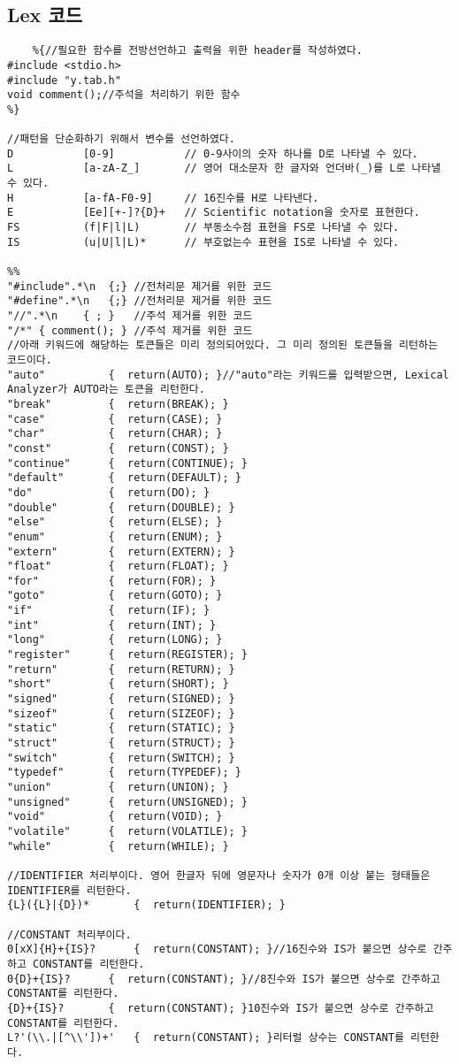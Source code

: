 \documentclass{article}
\begin{document}
\subsection{Lex 코드}
\begin{verbatim}
    %{//필요한 함수를 전방선언하고 출력을 위한 header를 작성하였다. 
#include <stdio.h>
#include "y.tab.h"
void comment();//주석을 처리하기 위한 함수
%}

//패턴을 단순화하기 위해서 변수를 선언하였다. 
D			[0-9]			// 0-9사이의 숫자 하나를 D로 나타낼 수 있다.
L			[a-zA-Z_]		// 영어 대소문자 한 글자와 언더바(_)를 L로 나타낼 수 있다.
H			[a-fA-F0-9]		// 16진수를 H로 나타낸다.
E			[Ee][+-]?{D}+	// Scientific notation을 숫자로 표현한다.
FS			(f|F|l|L)		// 부동소수점 표현을 FS로 나타낼 수 있다.
IS          (u|U|l|L)*		// 부호없는수 표현을 IS로 나타낼 수 있다.

%%
"#include".*\n	{;}	//전처리문 제거를 위한 코드	
"#define".*\n	{;}	//전처리문 제거를 위한 코드
"//".*\n	{ ; }	//주석 제거를 위한 코드
"/*" { comment(); }	//주석 제거를 위한 코드
//아래 키워드에 해당하는 토큰들은 미리 정의되어있다. 그 미리 정의된 토큰들을 리턴하는 코드이다.
"auto"			{  return(AUTO); }//"auto"라는 키워드를 입력받으면, Lexical Analyzer가 AUTO라는 토큰을 리턴한다.
"break"			{  return(BREAK); }
"case"			{  return(CASE); }
"char"			{  return(CHAR); }
"const"			{  return(CONST); }
"continue"		{  return(CONTINUE); }
"default"		{  return(DEFAULT); }
"do"			{  return(DO); }
"double"		{  return(DOUBLE); }
"else"			{  return(ELSE); }
"enum"			{  return(ENUM); }
"extern"		{  return(EXTERN); }
"float"			{  return(FLOAT); }
"for"			{  return(FOR); }
"goto"			{  return(GOTO); }
"if"			{  return(IF); }
"int"			{  return(INT); }
"long"			{  return(LONG); }
"register"		{  return(REGISTER); }
"return"		{  return(RETURN); }
"short"			{  return(SHORT); }
"signed"		{  return(SIGNED); }
"sizeof"		{  return(SIZEOF); }
"static"		{  return(STATIC); }
"struct"		{  return(STRUCT); }
"switch"		{  return(SWITCH); }
"typedef"		{  return(TYPEDEF); }
"union"			{  return(UNION); }
"unsigned"		{  return(UNSIGNED); }
"void"			{  return(VOID); }
"volatile"		{  return(VOLATILE); }
"while"			{  return(WHILE); }

//IDENTIFIER 처리부이다. 영어 한글자 뒤에 영문자나 숫자가 0개 이상 붙는 형태들은 IDENTIFIER를 리턴한다.
{L}({L}|{D})*		{  return(IDENTIFIER); }

//CONSTANT 처리부이다.
0[xX]{H}+{IS}?		{  return(CONSTANT); }//16진수와 IS가 붙으면 상수로 간주하고 CONSTANT를 리턴한다.
0{D}+{IS}?		{  return(CONSTANT); }//8진수와 IS가 붙으면 상수로 간주하고 CONSTANT를 리턴한다.	
{D}+{IS}?		{  return(CONSTANT); }10진수와 IS가 붙으면 상수로 간주하고 CONSTANT를 리턴한다.
L?'(\\.|[^\\'])+'	{  return(CONSTANT); }리터럴 상수는 CONSTANT를 리턴한다.


\end{verbatim}
\end{document}
